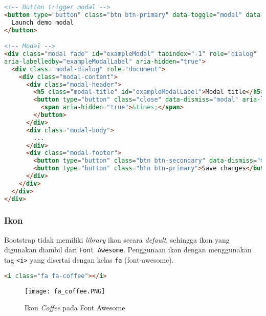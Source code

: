 \begin{itemize}
\begin{lstlisting}[language=HTML, caption=contoh aja, frame=single, basicstyle=\small] 
<!-- Button trigger modal -->
<button type="button" class="btn btn-primary" data-toggle="modal" data-target="#myModal">
  Launch demo modal
</button>

<!-- Modal -->
<div class="modal fade" id="exampleModal" tabindex="-1" role="dialog" 
aria-labelledby="exampleModalLabel" aria-hidden="true">
  <div class="modal-dialog" role="document">
    <div class="modal-content">
      <div class="modal-header">
        <h5 class="modal-title" id="exampleModalLabel">Modal title</h5>
        <button type="button" class="close" data-dismiss="modal" aria-label="Close">
          <span aria-hidden="true">&times;</span>
        </button>
      </div>
      <div class="modal-body">
        ...
      </div>
      <div class="modal-footer">
        <button type="button" class="btn btn-secondary" data-dismiss="modal">Close</button>
        <button type="button" class="btn btn-primary">Save changes</button>
      </div>
    </div>
  </div>
</div>
\end{lstlisting}

\subsubsection{Ikon}
Bootstrap tidak memiliki \textit{library} ikon secara \textit{default}, sehingga ikon yang digunakan diambil dari \texttt{Font Awesome}. Penggunaan ikon dengan menggunakan tag \texttt{<i>} yang disertai dengan kelas \texttt{fa} (font-awesome). 

\begin{lstlisting}[language=HTML, frame=single, basicstyle=\small]
<i class="fa fa-coffee"></i>
\end{lstlisting}

\begin{figure} [H]
	\centering  
	\texttt{[image: fa\_coffee.PNG]}  
	\caption{Ikon \textit{Coffee} pada Font Awesome} 
\end{figure}

\end{itemize}
